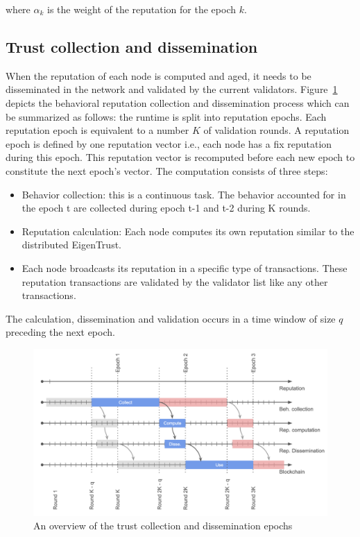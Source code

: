 \documentclass[]{article}
\begin{document}
where $\alpha_k$ is the weight of the reputation for the epoch $k$.  

\subsection{Trust collection and dissemination}
When the reputation of each node is computed and aged, it needs to be disseminated in the network and validated by the current validators. Figure~\ref{fig:disse} depicts the behavioral reputation collection and dissemination process which can be summarized as follows: the runtime is split into reputation epochs. Each reputation epoch is equivalent to a number $K$ of validation rounds. A reputation epoch is defined by one reputation vector i.e., each node has a fix reputation during this epoch. This reputation vector is recomputed before each new epoch to constitute the next epoch's vector. The computation consists of three steps:
\begin{itemize}
    \item Behavior collection: this is a continuous task. The behavior accounted for in the epoch t are collected during epoch t-1 and t-2 during K rounds.
    \item Reputation calculation: Each node computes its own reputation similar to the distributed EigenTrust.
    \item Each node broadcasts its reputation in a specific type of transactions. These reputation transactions are validated by the validator list like any other transactions.
\end{itemize}

The calculation, dissemination and validation occurs in a time window of size $q$ preceding the next epoch.


\begin{figure}[h]
\centering
	\includegraphics[width=\linewidth, trim= 0cm 0cm 0cm 0cm, clip]{Figures/synch.png}
	\caption{An overview of the trust collection and dissemination epochs}
	\label{fig:disse}
\end{figure}
\end{document}
